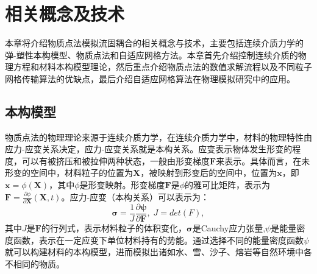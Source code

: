 \chapter{相关概念及技术} \label{chap:background}
本章将介绍物质点法模拟流固耦合的相关概念与技术，主要包括连续介质力学的弹-塑性本构模型、物质点法和自适应网格方法。本章首先介绍控制连续介质的物理方程和材料本构模型理论，然后重点介绍物质点法的数值求解流程以及不同粒子网格传输算法的优缺点，最后介绍自适应网格算法在物理模拟研究中的应用。

\section{本构模型}\label{sect:background:constitutive_model}
物质点法的物理理论来源于连续介质力学，在连续介质力学中，材料的物理特性由应力-应变关系决定，应力-应变关系就是本构关系。应变表示物体发生形变的程度，可以有被挤压和被拉伸两种状态，一般由形变梯度$\mathbf{F}$来表示。具体而言，在未形变的空间中，材料粒子的位置为$\mathbf{X}$，被映射到形变后的空间中，位置为$\mathbf{x}$，即$\mathbf{x} = \phi(\mathbf{X})$，其中$\phi$是形变映射。形变梯度$\mathbf{F}$是$\phi$的雅可比矩阵，表示为$\mathbf{F}=\frac{\partial \phi}{\partial \mathbf{X}}(\mathbf{X},t)$。应力-应变（本构关系）可以表示为：
\begin{equation}
    \mathbf{\sigma}=\frac{1}{J}\frac{\partial \mathbf{\psi}}{\partial \mathbf{F}}, \; 
    J = det(F),
\end{equation}
其中$J$是$\mathbf{F}$的行列式，表示材料粒子的体积变化，$\mathbf{\sigma}$是Cauchy应力张量,$\psi$是能量密度函数，表示在一定应变下单位材料持有的势能。通过选择不同的能量密度函数$\psi$就可以构建材料的本构模型，进而模拟出诸如水、雪、沙子、熔岩等自然环境中各不相同的物质。

